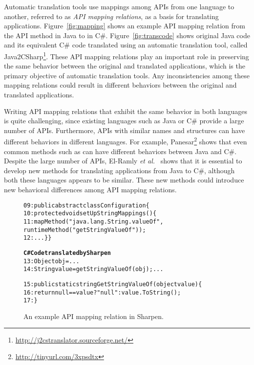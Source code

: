 Automatic translation tools use mappings among APIs from one language to another, referred to as \emph{API mapping relations}, as a basis for translating applications. Figure~\ref{fig:mapping} shows an example API mapping relation from the API method  in Java to  in C\#. Figure~\ref{fig:transcode} shows original Java code and its equivalent C\# code translated using an automatic translation tool, called Java2CSharp\footnote{\url{http://j2cstranslator.sourceforge.net/}}. These API mapping relations play an important role in preserving the same behavior between the original and translated applications, which is the primary objective of automatic translation tools. Any inconsistencies among these mapping relations could result in different behaviors between the original and translated applications.

Writing API mapping relations that exhibit the same behavior in both languages is quite challenging, since existing languages such as Java or C\# provide a large number of APIs. Furthermore, APIs with similar names and structures can have different behaviors in different languages. For example, Panesar\footnote{\url{http://tinyurl.com/3xpsdtx}} shows that even common methods such as  can have different behaviors between Java and C\#. Despite the large number of APIs, El-Ramly \emph{et al.}~\cite{el2006experiment} shows that it is essential to develop new methods for translating applications from Java to C\#, although both these languages appears to be similar. These new methods could introduce new behavioral differences among API mapping relations. 

\begin{figure}
\begin{CodeOut}
\begin{alltt}
09: public abstract class Configuration \{
10: protected void setUpStringMappings() \{
11:   mapMethod("java.lang.String.valueOf",
              runtimeMethod("getStringValueOf"));
12: ...\} \}

\textbf{C# Code translated by Sharpen}
13: Object obj = ...
14: String value = getStringValueOf(obj); ...

15: public static string GetStringValueOf(object value)\{
16:   return null == value? "null": value.ToString();
17: \}
\end{alltt}
\end{CodeOut}\vspace*{-4ex}
\caption{\label{fig:sharpen} An example API mapping relation in Sharpen.}\vspace*{-4ex}
\end{figure}


